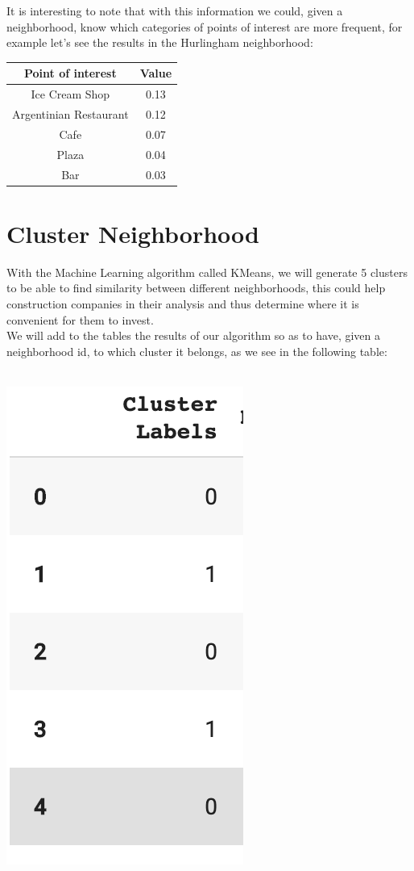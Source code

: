 \documentclass[12pt,a4paper]{tesis}
\begin{document}
It is interesting to note that with this information we could, given a neighborhood, know which categories of points of interest are more frequent, for example let's see the results in the Hurlingham neighborhood:

\begin{center}
 \begin{tabular}{||c c ||} 
 \hline
 Point of interest & Value \\ [0.5ex] 
 \hline\hline
 Ice Cream Shop & 0.13 \\ 
 \hline
 Argentinian Restaurant & 0.12 \\
 \hline
 Cafe & 0.07  \\
 \hline
 Plaza & 0.04  \\
 \hline
 Bar & 0.03  \\ [1ex] 
 \hline
\end{tabular}
\end{center}


\chapter{Cluster Neighborhood}
With the Machine Learning algorithm called KMeans, we will generate 5 clusters to be able to find similarity between different neighborhoods, this could help construction companies in their analysis and thus determine where it is convenient for them to invest. \\
We will add to the tables the results of our algorithm so as to have, given a neighborhood id, to which cluster it belongs, as we see in the following table: \\ \\
\centerline{
	\includegraphics[scale=0.5]{tabla3}
}
\end{document}
